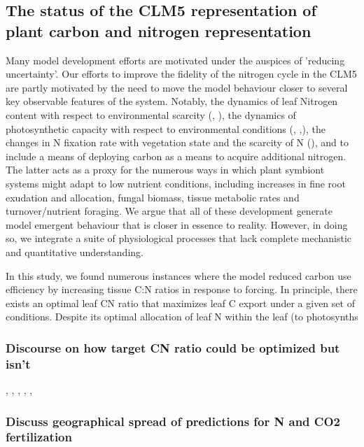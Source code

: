 \documentclass[draft,linenumbers]{agujournal}
\begin{document}
\subsection{The status of the CLM5 representation of plant carbon and nitrogen representation}
Many model development efforts are motivated under the auspices of 'reducing uncertainty'.  Our efforts to improve the fidelity of the nitrogen cycle in the CLM5 are partly motivated by the need to move the model behaviour closer to several key observable features of the system. Notably, the dynamics of leaf Nitrogen content with respect to environmental scarcity (\cite{zaehle2014}, \cite{brzostek2014}), the dynamics of photosynthetic capacity with respect to environmental conditions (\cite{xu2012}, \cite{ali2016},\cite{rogers2017}), the changes in N fixation rate with vegetation state and the scarcity of N (\cite{vitousek2002}), and to include a means of deploying carbon as a means to acquire additional nitrogen. The latter acts as a proxy for the numerous ways in which plant symbiont systems might adapt to low nutrient conditions, including increases in fine root exudation and allocation, fungal biomass, tissue metabolic rates and turnover/nutrient foraging.  We argue that all of these development generate model emergent behaviour that is closer in essence to reality. However, in doing so, we integrate a suite of physiological processes that lack complete mechanistic and quantitative understanding.

In this study, we found numerous instances where the model reduced carbon use efficiency by increasing tissue C:N ratios in response to forcing. In principle, there exists an optimal leaf CN ratio that maximizes leaf C export under a given set of conditions. Despite its optimal allocation of leaf N within the leaf (to photosynths

\subsubsection{Discourse on how target CN ratio could be optimized but isn't}

\cite{thomas2014}, \cite{friedlingstein1999}, \cite{franklin2012}, \cite{mcmurtrie2013}, \cite{anten2011}, \cite{vanwijk2003}


\subsubsection{Discuss geographical spread of predictions for N and CO2 fertilization}
\end{document}
